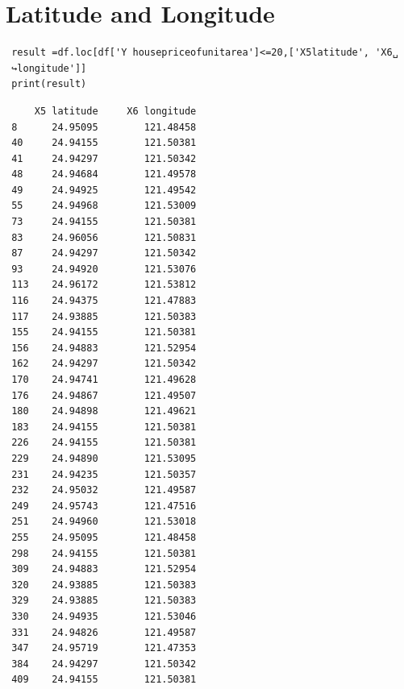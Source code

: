 \section{Latitude and Longitude}
\begin{lstlisting}
 result =df.loc[df['Y housepriceofunitarea']<=20,['X5latitude', 'X6␣
 ↪longitude']]
 print(result)
\end{lstlisting}
\begin{verbatim}
     X5 latitude     X6 longitude
 8      24.95095        121.48458
 40     24.94155        121.50381
 41     24.94297        121.50342
 48     24.94684        121.49578
 49     24.94925        121.49542
 55     24.94968        121.53009
 73     24.94155        121.50381
 83     24.96056        121.50831
 87     24.94297        121.50342
 93     24.94920        121.53076
 113    24.96172        121.53812
 116    24.94375        121.47883
 117    24.93885        121.50383
 155    24.94155        121.50381
 156    24.94883        121.52954
 162    24.94297        121.50342
 170    24.94741        121.49628
 176    24.94867        121.49507
 180    24.94898        121.49621
 183    24.94155        121.50381
 226    24.94155        121.50381
 229    24.94890        121.53095
 231    24.94235        121.50357
 232    24.95032        121.49587
 249    24.95743        121.47516
 251    24.94960        121.53018
 255    24.95095        121.48458
 298    24.94155        121.50381
 309    24.94883        121.52954
 320    24.93885        121.50383
 329    24.93885        121.50383
 330    24.94935        121.53046
 331    24.94826        121.49587
 347    24.95719        121.47353
 384    24.94297        121.50342
 409    24.94155        121.50381             
\end{verbatim}
